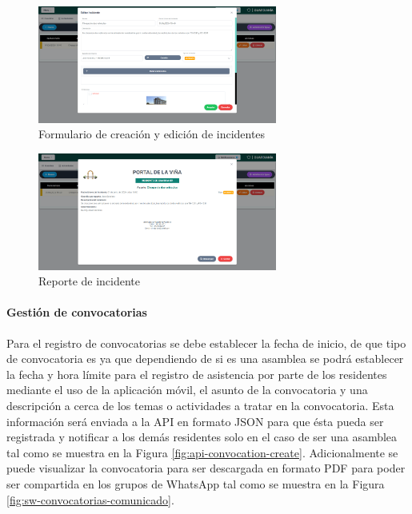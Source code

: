\begin{figure}[H]
    \centering
    \includegraphics[width=0.7\textwidth]{resources/images/sw-guard-incidents-form}
    \caption{Formulario de creación y edición de incidentes}
    \label{fig:sw-guard-incident-form}
\end{figure}

\begin{figure}[H]
    \centering
    \includegraphics[width=0.7\textwidth]{resources/images/sw-guard-incidents-report}
    \caption{Reporte de incidente}
    \label{fig:sw-guard-incidents-report}
\end{figure}

\paragraph{Gestión de convocatorias}

Para el registro de convocatorias se debe establecer la fecha de inicio, de que tipo de convocatoria es ya que dependiendo de si es una asamblea se podrá establecer la fecha y hora límite para el registro de asistencia por parte de los residentes mediante el uso de la aplicación móvil, el asunto de la convocatoria y una descripción a cerca de los temas o actividades a tratar en la convocatoria.
Esta información será enviada a la API en formato JSON para que ésta pueda ser registrada y notificar a los demás residentes solo en el caso de ser una asamblea tal como se muestra en la Figura \ref{fig:api-convocation-create}.
Adicionalmente se puede visualizar la convocatoria para ser descargada en formato PDF para poder ser compartida en los grupos de WhatsApp tal como se muestra en la Figura \ref{fig:sw-convocatorias-comunicado}.



